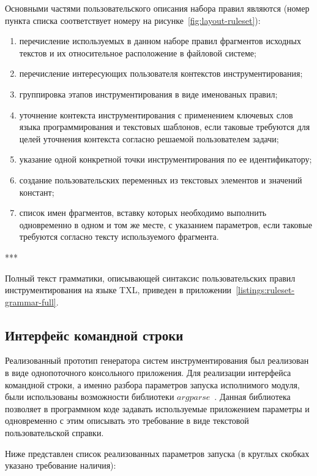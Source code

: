 Основными частями пользовательского описания набора правил являются (номер пункта списка соответствует номеру на рисунке~\ref{fig:layout-ruleset}):
\begin{enumerate}[noitemsep]
  \item перечисление используемых в данном наборе правил фрагментов исходных текстов и их относительное расположение в файловой системе;
  \item перечисление интересующих пользователя контекстов инструментирования;
  \item группировка этапов инструментирования в виде именованых правил;
  \item уточнение контекста инструментирования с применением ключевых слов языка программирования и текстовых шаблонов, если таковые требуются для целей уточнения контекста согласно решаемой пользователем задачи;
  \item указание одной конкретной точки инструментирования по ее идентификатору;
  \item создание пользовательских переменных из текстовых элементов и значений констант;
  \item список имен фрагментов, вставку которых необходимо выполнить одновременно в одном и том же месте, с указанием параметров, если таковые требуются согласно тексту используемого фрагмента.
\end{enumerate}

***

Полный текст грамматики, описывающей синтаксис пользовательских правил инструментирования на языке TXL, приведен в приложении~\ref{listings:ruleset-grammar-full}.

\subsection{Интерфейс командной строки}

Реализованный прототип генератора систем инструментирования был реализован в виде однопоточного консольного приложения.
Для реализации интерфейса командной строки, а именно разбора параметров запуска исполнимого модуля, были использованы возможности библиотеки $argparse$~\cite{argparse}.
Данная библиотека позволяет в программном коде задавать используемые приложением параметры и одновременно с этим описывать это требование в виде текстовой пользовательской справки.

Ниже представлен список реализованных параметров запуска (в круглых скобках указано требование наличия):

